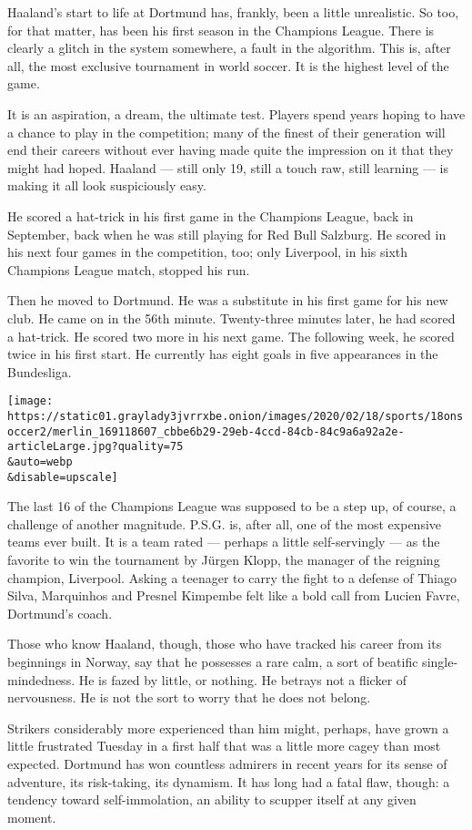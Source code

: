 Haaland's start to life at Dortmund has, frankly, been a little
unrealistic. So too, for that matter, has been his first season in the
Champions League. There is clearly a glitch in the system somewhere, a
fault in the algorithm. This is, after all, the most exclusive
tournament in world soccer. It is the highest level of the game.

It is an aspiration, a dream, the ultimate test. Players spend years
hoping to have a chance to play in the competition; many of the finest
of their generation will end their careers without ever having made
quite the impression on it that they might had hoped. Haaland --- still
only 19, still a touch raw, still learning --- is making it all look
suspiciously easy.

He scored a hat-trick in his first game in the Champions League, back in
September, back when he was still playing for Red Bull Salzburg. He
scored in his next four games in the competition, too; only Liverpool,
in his sixth Champions League match, stopped his run.

Then he moved to Dortmund. He was a substitute in his first game for his
new club. He came on in the 56th minute. Twenty-three minutes later, he
had scored a hat-trick. He scored two more in his next game. The
following week, he scored twice in his first start. He currently has
eight goals in five appearances in the Bundesliga.

\texttt{[image: https://static01.graylady3jvrrxbe.onion/images/2020/02/18/sports/18onsoccer2/merlin\_169118607\_cbbe6b29-29eb-4ccd-84cb-84c9a6a92a2e-articleLarge.jpg?quality=75\\\&auto=webp\\\&disable=upscale]}

The last 16 of the Champions League was supposed to be a step up, of
course, a challenge of another magnitude. P.S.G. is, after all, one of
the most expensive teams ever built. It is a team rated --- perhaps a
little self-servingly --- as the favorite to win the tournament by
Jürgen Klopp, the manager of the reigning champion, Liverpool. Asking a
teenager to carry the fight to a defense of Thiago Silva, Marquinhos and
Presnel Kimpembe felt like a bold call from Lucien Favre, Dortmund's
coach.

Those who know Haaland, though, those who have tracked his career from
its beginnings in Norway, say that he possesses a rare calm, a sort of
beatific single-mindedness. He is fazed by little, or nothing. He
betrays not a flicker of nervousness. He is not the sort to worry that
he does not belong.

Strikers considerably more experienced than him might, perhaps, have
grown a little frustrated Tuesday in a first half that was a little more
cagey than most expected. Dortmund has won countless admirers in recent
years for its sense of adventure, its risk-taking, its dynamism. It has
long had a fatal flaw, though: a tendency toward self-immolation, an
ability to scupper itself at any given moment.

